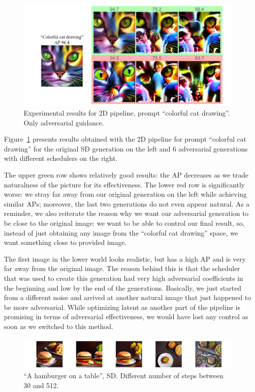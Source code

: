 \begin{figure}[htp]
\centering
\includegraphics[width=150mm]{figures/2d_res.png}
\caption{Experimental results for 2D pipeline, prompt ``colorful cat drawing''. Only adversarial guidance.}
\label{2d_res}
\end{figure}

Figure~\ref{2d_res} presents results obtained with the 2D pipeline for prompt ``colorful cat drawing'' for the original SD generation on the left and 6 adversarial generations with different schedulers on the right.

The upper green row shows relatively good results: the AP decreases as we trade naturalness of the picture for its effectiveness.
The lower red row is significantly worse: we stray far away from our original generation on the left while achieving similar APs; moreover, the last two generations do not even appear natural.
As a reminder, we also reiterate the reason why we want our adversarial generation to be close to the original image: we want to be able to control our final result, so, instead of just obtaining any image from the ``colorful cat drawing'' space, we want something close to provided image.

The first image in the lower world looks realistic, but has a high AP and is very far away from the original image.
The reason behind this is that the scheduler that was used to create this generation had very high adversarial coefficients in the beginning and low by the end of the generations.
Basically, we just started from a different noise and arrived at another natural image that just happened to be more adversarial.
While optimizing latent as another part of the pipeline is promising in terms of adversarial effectiveness, we would have lost any control as soon as we switched to this method.

\begin{figure}[htp]
\centering
\includegraphics[width=150mm]{figures/hamburger.png}
\caption{``A hamburger on a table'', SD. Different number of steps between 30 and 512.}
\label{hamburger}
\end{figure}

